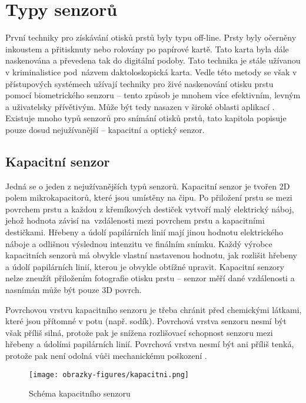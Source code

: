 \section{Typy senzorů}
První techniky pro získávání otisků prstů byly typu off-line. Prsty byly očerněny inkoustem a přitisknuty nebo rolovány po papírové kartě. Tato karta byla dále naskenována a převedena tak do digitální podoby. Tato technika je stále užívanou v kriminalistice pod~názvem daktoloskopická karta. Vedle této metody se však v přístupových systémech užívají techniky pro živé naskenování otisku prstu pomocí biometrického senzoru -- tento způsob je mnohem více efektivním, levným a uživatelsky přívětivým. Může být tedy nasazen v široké oblasti aplikací \cite{Maltoni2009}. Existuje mnoho typů senzorů pro snímání otisků prstů, tato kapitola popisuje pouze dosud nejužívanější -- kapacitní a optický senzor.

\subsection{Kapacitní senzor}
Jedná se o jeden z nejužívanějších typů senzorů. Kapacitní senzor je tvořen 2D polem mikrokapacitorů, které jsou umístěny na čipu. Po přiložení prstu se mezi povrchem prstu a každou z křemíkových destiček vytvoří malý elektrický náboj, jehož hodnota závisí na~vzdálenosti mezi povrchem prstu a kapacitními destičkami. Hřebeny a údolí papilárních linií mají jinou hodnotu elektrického náboje a odlišnou výslednou intenzitu ve finálním snímku. Každý výrobce kapacitních senzorů má obvykle vlastní nastavenou hodnotu, jak rozlišit hřebeny a údolí papilárních linií, kterou je obvykle obtížné upravit. Kapacitní senzory nelze zneužít přiložením fotografie otisku prstu -- senzor měří dané vzdálenosti a nasnímán může být pouze 3D povrch. 

Povrchovou vrstvu kapacitního senzoru je třeba chránit před chemickými látkami, které jsou přítomné v potu (např. sodík). Povrchová vrstva senzoru nesmí být však příliš silná, protože pak je snížena rozlišovací schopnost senzoru mezi hřebeny a údolími papilárních linií. Povrchová vrstva nesmí být ani příliš tenká, protože pak není odolná vůči mechanickému poškození \cite{Maltoni2009}. 

\begin{figure}[!htbp]
    \centering
    \texttt{[image: obrazky-figures/kapacitni.png]}
    \caption{Schéma kapacitního senzoru \cite{Maltoni2009}}
\end{figure}

